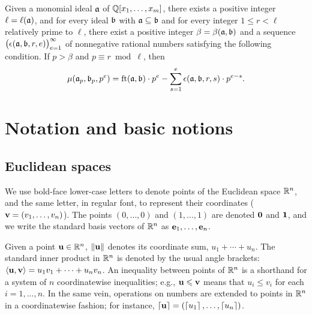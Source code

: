 \documentclass[11pt]{amsart}
\begin{document}
\begin{theorem}
   \label{general-mu-theorem: T}
   Given a monomial ideal $\mathfrak{a}$ of $\mathbb{Q}[x_1, \ldots, x_m]$, there exists a positive integer $\ell = \ell(\mathfrak{a})$, and for every ideal $\mathfrak{b}$ with $\mathfrak{a} \subseteq {\mathfrak{b}}$ and for every integer $1 \leq r < \ell$ relatively prime to $\ell$, there exist a positive integer $\beta = \beta(\mathfrak{a}, \mathfrak{b})$ and a sequence $\big(\epsilon(\mathfrak{a}, \mathfrak{b}, r, e)\big)_{e=1}^{\infty}$ of nonnegative rational numbers satisfying the following condition.
   If $p > \beta$ and $p \equiv r \bmod \ell$, then
   \[ \mu(\mathfrak{a}_p, \mathfrak{b}_p, p^e) = \operatorname{ft}(\mathfrak{a}, \mathfrak{b}) \cdot p^e - \sum_{s=1}^{e} \epsilon(\mathfrak{a}, \mathfrak{b}, r, s) \cdot p^{e-s}.\]
\end{theorem}




\newpage
\section{Notation and basic notions}


\subsection{Euclidean spaces}
\label{ss: euclidean spaces and convexity}
We use bold-face lower-case letters to denote points of the Euclidean space $\mathbb{R}^n$, and the same letter, in regular font, to represent their coordinates (\eg $\mathbf{v}=(v_1,\ldots,v_n)$).
The points $(0,\ldots,0)$ and $(1,\ldots,1)$ are denoted $\mathbf{0}$ and $\mathbf{1}$, and we write the standard basis vectors of $\mathbb{R}^n$ as $\mathbf{e}_1,\ldots,\mathbf{e}_n$.

Given a point $\mathbf{u}\in \mathbb{R}^n$, $\| \mathbf{u} \|$ denotes its coordinate sum, $u_1+\cdots+u_n$.
The standard inner product in $\mathbb{R}^n$ is denoted by the usual angle brackets: $\langle \mathbf{u}, \mathbf{v} \rangle = u_1v_1 + \cdots + u_nv_n$.
An inequality between points of $\mathbb{R}^n$ is a shorthand for a system of $n$ coordinatewise inequalities; e.g., $\mathbf{u}\leqslant \mathbf{v}$ means that $u_i \le v_i$ for each $i=1,\ldots,n$.
In the same vein, operations on numbers are extended to points in $\mathbb{R}^n$ in a coordinatewise fashion; for instance, $\left\lceil \mathbf{u} \right\rceil=(\left\lceil u_1 \right\rceil,\ldots,\left\lceil u_n \right\rceil)$.
\end{document}
